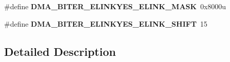 \begin{DoxyCompactItemize}
\item 
\#define {\bfseries D\+M\+A\+\_\+\+B\+I\+T\+E\+R\+\_\+\+E\+L\+I\+N\+K\+Y\+E\+S\+\_\+\+E\+L\+I\+N\+K\+\_\+\+M\+A\+SK}~0x8000u\hypertarget{group__DMA__Register__Masks_ga778135a3df3e1f1696c74d53062dbe27}{}\label{group__DMA__Register__Masks_ga778135a3df3e1f1696c74d53062dbe27}

\item 
\#define {\bfseries D\+M\+A\+\_\+\+B\+I\+T\+E\+R\+\_\+\+E\+L\+I\+N\+K\+Y\+E\+S\+\_\+\+E\+L\+I\+N\+K\+\_\+\+S\+H\+I\+FT}~15\hypertarget{group__DMA__Register__Masks_ga140716200d5f09b3f8819f8794444008}{}\label{group__DMA__Register__Masks_ga140716200d5f09b3f8819f8794444008}

\end{DoxyCompactItemize}


\subsection{Detailed Description}
